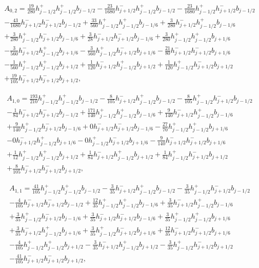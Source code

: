 \documentclass[12pt]{article}
\begin{document}
\begin{multline*} A_{0,2} = \frac{19}{280} h_{j-1/2}^+ h_{j-1/2}^+ b_{j-1/2}-\frac{23}{1680} h_{j+1/2}^- h_{j-1/2}^+ b_{j-1/2}-\frac{23}{1680} h_{j-1/2}^+ h_{j+1/2}^- b_{j-1/2}\\-\frac{43}{1680} h_{j+1/2}^- h_{j+1/2}^- b_{j-1/2}+\frac{33}{560} h_{j-1/2}^+ h_{j-1/2}^+ b_{j-1/6}+\frac{3}{280} h_{j+1/2}^- h_{j-1/2}^+ b_{j-1/6}\\+\frac{3}{280} h_{j-1/2}^+ h_{j+1/2}^- b_{j-1/6}+\frac{3}{28} h_{j+1/2}^- h_{j+1/2}^- b_{j-1/6}+\frac{3}{280} h_{j-1/2}^+ h_{j-1/2}^+ b_{j+1/6}\\-\frac{3}{560} h_{j+1/2}^- h_{j-1/2}^+ b_{j+1/6}-\frac{3}{560} h_{j-1/2}^+ h_{j+1/2}^- b_{j+1/6}-\frac{21}{80} h_{j+1/2}^- h_{j+1/2}^- b_{j+1/6}\\-\frac{1}{560} h_{j-1/2}^+ h_{j-1/2}^+ b_{j+1/2}+\frac{1}{120} h_{j+1/2}^- h_{j-1/2}^+ b_{j+1/2}+\frac{1}{120} h_{j-1/2}^+ h_{j+1/2}^- b_{j+1/2}\\+\frac{19}{105} h_{j+1/2}^- h_{j+1/2}^- b_{j+1/2}, \end{multline*}

\begin{multline*} A_{1,0} = \frac{193}{210} h_{j-1/2}^+ h_{j-1/2}^+ b_{j-1/2}-\frac{8}{105} h_{j+1/2}^- h_{j-1/2}^+ b_{j-1/2}-\frac{8}{105} h_{j-1/2}^+ h_{j+1/2}^- b_{j-1/2}\\-\frac{1}{84} h_{j+1/2}^- h_{j+1/2}^- b_{j-1/2}+\frac{171}{140} h_{j-1/2}^+ h_{j-1/2}^+ b_{j-1/6}+\frac{9}{140} h_{j+1/2}^- h_{j-1/2}^+ b_{j-1/6}\\+\frac{9}{140} h_{j-1/2}^+ h_{j+1/2}^- b_{j-1/6}+0 h_{j+1/2}^- h_{j+1/2}^- b_{j-1/6}-\frac{27}{70} h_{j-1/2}^+ h_{j-1/2}^+ b_{j+1/6}\\-0 h_{j+1/2}^- h_{j-1/2}^+ b_{j+1/6}-0 h_{j-1/2}^+ h_{j+1/2}^- b_{j+1/6}-\frac{9}{140} h_{j+1/2}^- h_{j+1/2}^- b_{j+1/6}\\+\frac{1}{12} h_{j-1/2}^+ h_{j-1/2}^+ b_{j+1/2}+\frac{1}{84} h_{j+1/2}^- h_{j-1/2}^+ b_{j+1/2}+\frac{1}{84} h_{j-1/2}^+ h_{j+1/2}^- b_{j+1/2}\\+\frac{8}{105} h_{j+1/2}^- h_{j+1/2}^- b_{j+1/2}, \end{multline*}

\begin{multline*} A_{1,1} = \frac{41}{105} h_{j-1/2}^+ h_{j-1/2}^+ b_{j-1/2}-\frac{3}{35} h_{j+1/2}^- h_{j-1/2}^+ b_{j-1/2}-\frac{3}{35} h_{j-1/2}^+ h_{j+1/2}^- b_{j-1/2}\\-\frac{4}{105} h_{j+1/2}^- h_{j+1/2}^- b_{j-1/2}+\frac{12}{35} h_{j-1/2}^+ h_{j-1/2}^+ b_{j-1/6}+\frac{3}{35} h_{j+1/2}^- h_{j-1/2}^+ b_{j-1/6}\\+\frac{3}{35} h_{j-1/2}^+ h_{j+1/2}^- b_{j-1/6}+\frac{3}{35} h_{j+1/2}^- h_{j+1/2}^- b_{j-1/6}+\frac{3}{35} h_{j-1/2}^+ h_{j-1/2}^+ b_{j+1/6}\\+\frac{3}{35} h_{j+1/2}^- h_{j-1/2}^+ b_{j+1/6}+\frac{3}{35} h_{j-1/2}^+ h_{j+1/2}^- b_{j+1/6}+\frac{12}{35} h_{j+1/2}^- h_{j+1/2}^- b_{j+1/6}\\-\frac{4}{105} h_{j-1/2}^+ h_{j-1/2}^+ b_{j+1/2}-\frac{3}{35} h_{j+1/2}^- h_{j-1/2}^+ b_{j+1/2}-\frac{3}{35} h_{j-1/2}^+ h_{j+1/2}^- b_{j+1/2}\\-\frac{41}{105} h_{j+1/2}^- h_{j+1/2}^- b_{j+1/2}, \end{multline*}
\end{document}
